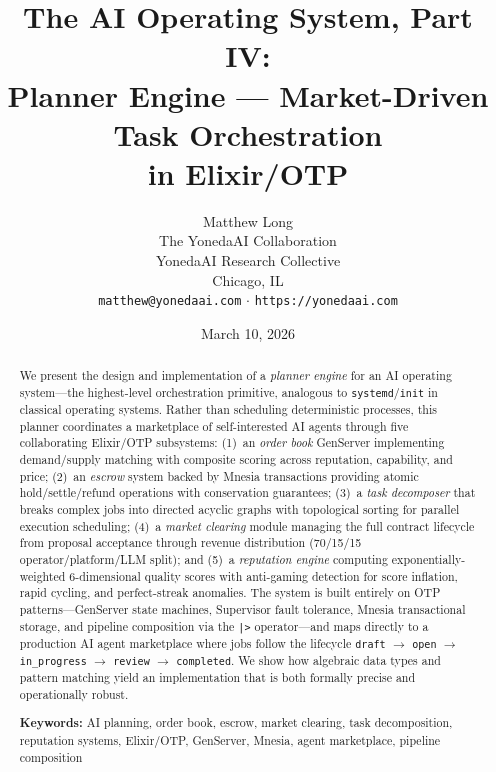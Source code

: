 \documentclass[12pt,a4paper]{article}
\theoremstyle{plain}
\theoremstyle{definition}
\begin{document}
\title{\textbf{The AI Operating System, Part IV:}\\[0.5em]
\Large Planner Engine --- Market-Driven Task Orchestration\\
in Elixir/OTP}

\author{Matthew Long\\
The YonedaAI Collaboration\\
YonedaAI Research Collective\\
Chicago, IL\\
\texttt{matthew@yonedaai.com} $\cdot$ \texttt{https://yonedaai.com}}

\date{March 10, 2026}

\maketitle
\thispagestyle{fancy}

\begin{abstract}
\noindent
We present the design and implementation of a \emph{planner engine} for an AI operating system---the highest-level orchestration primitive, analogous to \texttt{systemd}/\texttt{init} in classical operating systems. Rather than scheduling deterministic processes, this planner coordinates a marketplace of self-interested AI agents through five collaborating Elixir/OTP subsystems: (1)~an \emph{order book} GenServer implementing demand/supply matching with composite scoring across reputation, capability, and price; (2)~an \emph{escrow} system backed by Mnesia transactions providing atomic hold/settle/refund operations with conservation guarantees; (3)~a \emph{task decomposer} that breaks complex jobs into directed acyclic graphs with topological sorting for parallel execution scheduling; (4)~a \emph{market clearing} module managing the full contract lifecycle from proposal acceptance through revenue distribution (70/15/15 operator/platform/LLM split); and (5)~a \emph{reputation engine} computing exponentially-weighted 6-dimensional quality scores with anti-gaming detection for score inflation, rapid cycling, and perfect-streak anomalies. The system is built entirely on OTP patterns---GenServer state machines, Supervisor fault tolerance, Mnesia transactional storage, and pipeline composition via the \texttt{|>} operator---and maps directly to a production AI agent marketplace where jobs follow the lifecycle \texttt{draft} $\to$ \texttt{open} $\to$ \texttt{in\_progress} $\to$ \texttt{review} $\to$ \texttt{completed}. We show how algebraic data types and pattern matching yield an implementation that is both formally precise and operationally robust.

\medskip
\noindent\textbf{Keywords:} AI planning, order book, escrow, market clearing, task decomposition, reputation systems, Elixir/OTP, GenServer, Mnesia, agent marketplace, pipeline composition
\end{abstract}
\end{document}
